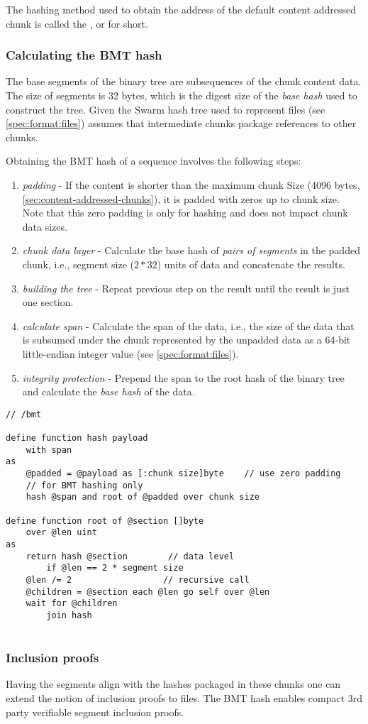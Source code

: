 The hashing method used to obtain the address of the default content addressed chunk is called the , or  for short. 

\subsubsection{Calculating the BMT hash}

The base segments of the binary tree are subsequences of the chunk content data. 
The size of segments is 32  bytes, which is the digest size of the \emph{base hash} used to construct the tree. 
Given the Swarm hash tree used to represent files (see \ref{spec:format:files}) assumes that intermediate chunks package references to other chunks. 

Obtaining the BMT hash of a sequence involves the following steps:

\begin{enumerate}
\item \emph{padding} - If the content is shorter than the maximum chunk Size  (4096 bytes, \ref{sec:content-addressed-chunks}), it is padded with zeros up to chunk size. Note that this zero padding is only for hashing and does not impact chunk data sizes.
\item \emph{chunk data layer} - Calculate the base hash of \emph{pairs of segments} in the padded chunk, i.e., segment size ($2 * 32$) units of data and concatenate the results.
\item \emph{building the tree} - Repeat previous step on the result until the result is just one section.
\item \emph{calculate span} - Calculate the span of the data, i.e., the size of the data that is subsumed under the chunk represented by the unpadded data as a 64-bit little-endian integer value (see  \ref{spec:format:files}).            
\item \emph{integrity protection} - Prepend the span to the root hash of the binary tree and calculate the \emph{base hash} of the data.
\end{enumerate}

\begin{definition}\label{def:bmt-hash}
\begin{lstlisting}[language=buzz1]
// /bmt

define function hash payload 
    with span
as
    @padded = @payload as [:chunk size]byte    // use zero padding 
    // for BMT hashing only
    hash @span and root of @padded over chunk size 
    
define function root of @section []byte
    over @len uint
as
    return hash @section        // data level
        if @len == 2 * segment size
    @len /= 2                  // recursive call
    @children = @section each @len go self over @len
    wait for @children 
        join hash
    

\end{lstlisting}
\end{definition}

\subsubsection{Inclusion proofs}

Having the segments align with the hashes packaged in these chunks one can extend the notion of inclusion proofs to files.
The BMT hash enables compact 3rd party verifiable segment inclusion proofs.

